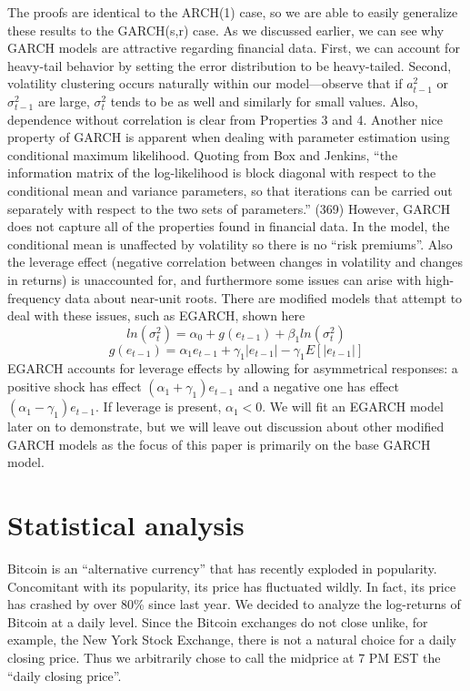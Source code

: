 \documentclass[12pt]{article}
\begin{document}
The proofs are identical to the ARCH(1) case, so we are able to easily generalize these results to the GARCH(s,r) case. As we discussed earlier, we can see why GARCH models are attractive regarding financial data. First, we can account for heavy-tail behavior by setting the error distribution to be heavy-tailed. Second, volatility clustering occurs naturally within our model---observe that if $a^2_{t-1}$ or $\sigma^2_{t-1}$ are large, $\sigma^2_t$ tends to be as well and similarly for small values. Also, dependence without correlation is clear from Properties 3 and 4. Another nice property of GARCH is apparent when dealing with parameter estimation using conditional maximum likelihood. Quoting from Box and Jenkins, ``the information matrix of the log-likelihood is block diagonal with respect to the conditional mean and variance parameters, so that iterations can be carried out separately with respect to the two sets of parameters.'' (369) \cite{box} However, GARCH does not capture all of the properties found in financial data. In the model, the conditional mean is unaffected by volatility so there is no ``risk premiums''. Also the leverage effect (negative correlation between changes in volatility and changes in returns) is unaccounted for, and furthermore some issues can arise with high-frequency data about near-unit roots. There are modified models that attempt to deal with these issues, such as EGARCH, shown here
\begin{equation}
    ln(\sigma^2_t) = \alpha_0 + g(e_{t-1}) + \beta_1 ln(\sigma^2_t)
    \end{equation}
\begin{equation}
    g(e_{t-1}) = \alpha_1 e_{t-1} + \gamma_1 |e_{t-1}| - \gamma_1 E[|e_{t-1}|]
\end{equation}
EGARCH accounts for leverage effects by allowing for asymmetrical responses: a positive shock has effect $(\alpha_1 + \gamma_1)e_{t-1}$ and a negative one has effect $(\alpha_1 - \gamma_1)e_{t-1}$. If leverage is present, $\alpha_1 < 0$. We will fit an EGARCH model later on to demonstrate, but we will leave out discussion about other modified GARCH models as the focus of this paper is primarily on the base GARCH model.

\section{Statistical analysis}
Bitcoin is an ``alternative currency'' that has recently exploded in popularity. Concomitant with its popularity, its price has fluctuated wildly. In fact, its price has crashed by over 80\% since last year. We decided to analyze the log-returns of Bitcoin at a daily level. Since the Bitcoin exchanges do not close unlike, for example, the New York Stock Exchange, there is not a natural choice for a daily closing price. Thus we arbitrarily chose to call the midprice at 7 PM EST the ``daily closing price''.
\end{document}
